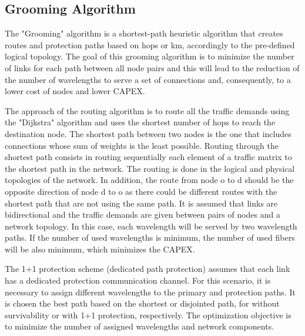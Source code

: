 \subsection{Grooming Algorithm}\label{grooming_algorithm}

\vspace{11pt}
The "Grooming" algorithm is a shortest-path heuristic algorithm that creates routes and protection paths based on hops or km, accordingly to the pre-defined logical topology. The goal of this grooming algorithm is to minimize the number of links for each path between all node pairs and this will lead to the reduction of the number of wavelengths to serve a set of connections and, consequently, to a lower cost of nodes and lower CAPEX.

The approach of the routing algorithm is to route all the traffic demands using the "Dijkstra" algorithm and uses the shortest number of hops to reach the destination node. The shortest path between two nodes is the one that includes connections whose sum of weights is the least possible. Routing through the shortest path consists in routing sequentially each element of a traffic matrix to the shortest path in the network. The routing is done in the logical and physical topologies of the network. In addition, the route from node o to d should be the opposite direction of node d to o as there could be different routes with the shortest path that are not using the same path. It is assumed that links are bidirectional and the traffic demands are given between pairs of nodes and a network topology. In this case, each wavelength will be served by two wavelength paths. If the number of used wavelengths is minimum, the number of used fibers will be also minimum, which minimizes the CAPEX.

The 1+1 protection scheme (dedicated path protection) assumes that each link has a dedicated protection communication channel. For this scenario, it is necessary to assign different wavelengths to the primary and protection paths. It is chosen the best path based on the shortest or disjointed path, for without survivability or with 1+1 protection, respectively. The optimization objective is to minimize the number of assigned wavelengths and network components.

